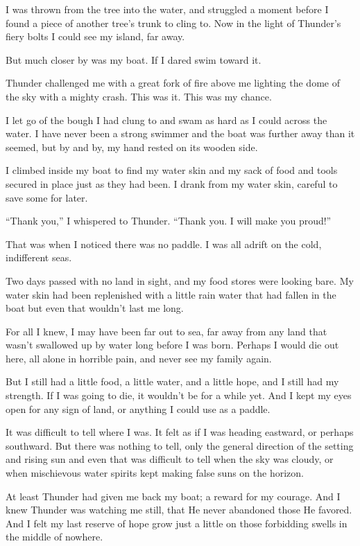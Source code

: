 I was thrown from the tree into the water, and struggled a moment before I found a piece of another tree's trunk to cling to. Now in the light of Thunder's fiery bolts I could see my island, far away.

But much closer by was my boat. If I dared swim toward it.

Thunder challenged me with a great fork of fire above me lighting the dome of the sky with a mighty crash. This was it. This was my chance.

I let go of the bough I had clung to and swam as hard as I could across the water. I have never been a strong swimmer and the boat was further away than it seemed, but by and by, my hand rested on its wooden side.

I climbed inside my boat to find my water skin and my sack of food and tools secured in place just as they had been. I drank from my water skin, careful to save some for later.

``Thank you,'' I whispered to Thunder. ``Thank you. I will make you proud!''

That was when I noticed there was no paddle. I was all adrift on the cold, indifferent seas.

\secdiv

\noindent Two days passed with no land in sight, and my food stores were looking bare. My water skin had been replenished with a little rain water that had fallen in the boat but even that wouldn't last me long.

For all I knew, I may have been far out to sea, far away from any land that wasn't swallowed up by water long before I was born. Perhaps I would die out here, all alone in horrible pain, and never see my family again.

But I still had a little food, a little water, and a little hope, and I still had my strength. If I was going to die, it wouldn't be for a while yet. And I kept my eyes open for any sign of land, or anything I could use as a paddle.

It was difficult to tell where I was. It felt as if I was heading eastward, or perhaps southward. But there was nothing to tell, only the general direction of the setting and rising sun and even that was difficult to tell when the sky was cloudy, or when mischievous water spirits kept making false suns on the horizon.

At least Thunder had given me back my boat; a reward for my courage. And I knew Thunder was watching me still, that He never abandoned those He favored. And I felt my last reserve of hope grow just a little on those forbidding swells in the middle of nowhere.

